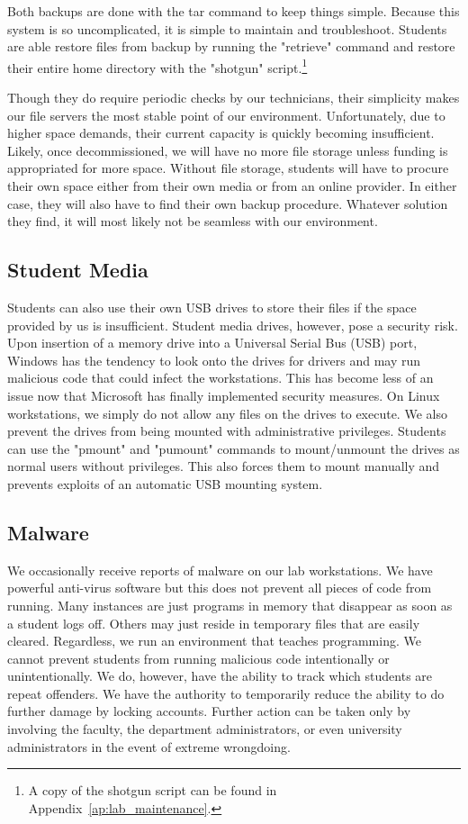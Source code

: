 Both backups are done with the tar command to keep things simple.  Because this system is so uncomplicated, it is simple to maintain and troubleshoot.  Students are able restore files from backup by running the "retrieve" command and restore their entire home directory with the "shotgun" script.\footnote{A copy of the shotgun script can be found in Appendix~\ref{ap:lab_maintenance}.}

Though they do require periodic checks by our technicians, their simplicity makes our file servers the most stable point of our environment.  Unfortunately, due to higher space demands, their current capacity is quickly becoming insufficient.  Likely, once decommissioned, we will have no more file storage unless funding is appropriated for more space.  Without file storage, students will have to procure their own space either from their own media or from an online provider.  In either case, they will also have to find their own backup procedure.  Whatever solution they find, it will most likely not be seamless with our environment. 

\subsection{Student Media}
Students can also use their own USB drives to store their files if the space provided by us is insufficient.  Student media drives, however, pose a security risk. Upon insertion of a memory drive into a Universal Serial Bus (USB) port, Windows has the tendency to look onto the drives for drivers and may run malicious code that could infect the workstations.  This has become less of an issue now that Microsoft has finally implemented security measures.  On Linux workstations, we simply do not allow any files on the drives to execute.  We also prevent the drives from being mounted with administrative privileges.  Students can use the "pmount" and "pumount" commands to mount/unmount the drives as normal users without privileges.  This also forces them to mount manually and prevents exploits of an automatic USB mounting system.  

\subsection{Malware}
We occasionally receive reports of malware on our lab workstations.  We have powerful anti-virus software but this does not prevent all pieces of code from running.  Many instances are just programs in memory that disappear as soon as a student logs off.  Others may just reside in temporary files that are easily cleared.  Regardless, we run an environment that teaches programming.  We cannot prevent students from running malicious code intentionally or unintentionally.  We do, however, have the ability to track which students are repeat offenders.  We have the authority to temporarily reduce the ability to do further damage by locking accounts.  Further action can be taken only by involving the faculty, the department administrators, or even university administrators in the event of extreme wrongdoing. 
